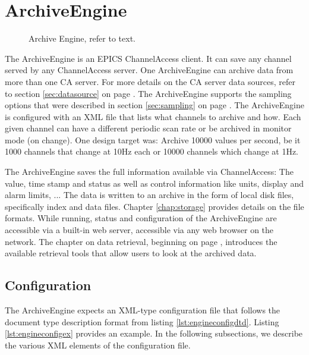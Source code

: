 \chapter{ArchiveEngine}

\begin{figure}[htb]
\begin{center}
\end{center}
\caption{\label{fig:engine}Archive Engine, refer to text.}
\end{figure}

\noindent The ArchiveEngine is an EPICS ChannelAccess client. It can
save any channel served by any ChannelAccess server. One ArchiveEngine
can archive data from more than one CA server. For more details on the
CA server data sources, refer to section \ref{sec:datasource} on page
\pageref{sec:datasource}.  The ArchiveEngine supports the sampling
options that were described in section \ref{sec:sampling} on page
\pageref{sec:sampling}.  The ArchiveEngine is configured with an XML
file that lists what channels to archive and how. Each given channel
can have a different periodic scan rate or be archived in monitor mode
(on change).  One design target was: Archive 10000 values per second,
be it 1000 channels that change at 10Hz each or 10000 channels which
change at 1Hz.

The ArchiveEngine saves the full information available via
ChannelAccess: The value, time stamp and status as well as
control information like units, display and alarm limits, ...  
The data is written to an archive in the form of local disk files,
specifically index and data files.  Chapter \ref{chap:storage}
provides details on the file formats.
While running, status and configuration of the ArchiveEngine are
accessible via a built-in web server, accessible via any web browser
on the network.  The chapter on data retrieval, beginning on page
\pageref{chap:retrieval}, introduces the available retrieval tools
that allow users to look at the archived data.

\section{Configuration}
The ArchiveEngine expects an XML-type configuration file that follows
the document type description format from listing
\ref{lst:engineconfigdtd}. Listing \ref{lst:engineconfigex} provides
an example. In the following subsections, we describe the various XML
elements of the configuration file.

